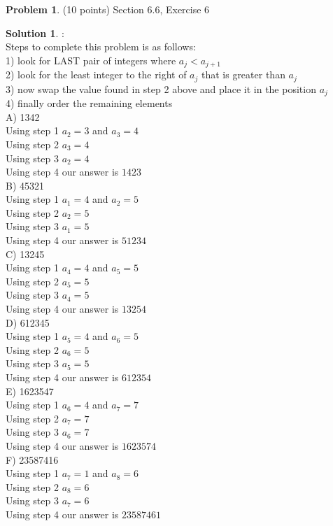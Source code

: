 \documentclass{article}
\theoremstyle{definition}
\newtheorem{problem}{Problem}
\newtheorem*{solution}{Solution}
\begin{document}
\begin{problem} (10 points) Section 6.6, Exercise 6
\end{problem}
\begin{solution}:
\\
Steps to complete this problem is as follows:
\\
1) look for LAST pair of integers where $a_j < a_{j+1}$
\\
2) look for the least integer to the right of $a_j$ that is greater than $a_j$
\\
3) now swap the value found in step 2 above and place it in the position $a_j$
\\
4) finally order the remaining elements
\\

A) 1342
\\
Using step 1 $a_2 = 3$ and $a_3 = 4$
\\
Using step 2 $a_3 = 4$
\\
Using step 3 $a_2 = 4$
\\
Using step 4 our answer is $1423$
\\

B) 45321
\\
Using step 1 $a_1 = 4$ and $a_2 = 5$
\\
Using step 2 $a_2 = 5$
\\
Using step 3 $a_1 = 5$
\\
Using step 4 our answer is $51234$
\\

C) 13245
\\
Using step 1 $a_4 = 4$ and $a_5 = 5$
\\
Using step 2 $a_5 = 5$
\\
Using step 3 $a_4 = 5$
\\
Using step 4 our answer is $13254$
\\

D) 612345
\\
Using step 1 $a_5 = 4$ and $a_6 = 5$
\\
Using step 2 $a_6 = 5$
\\
Using step 3 $a_5 = 5$
\\
Using step 4 our answer is $612354$
\\

E) 1623547
\\
Using step 1 $a_6 = 4$ and $a_7 = 7$
\\
Using step 2 $a_7 = 7$
\\
Using step 3 $a_6 = 7$
\\
Using step 4 our answer is $1623574$
\\

F) 23587416
\\
Using step 1 $a_7 = 1$ and $a_8 = 6$
\\
Using step 2 $a_8 = 6$
\\
Using step 3 $a_7 = 6$
\\
Using step 4 our answer is $23587461$
\\
\end{solution}
\end{document}
